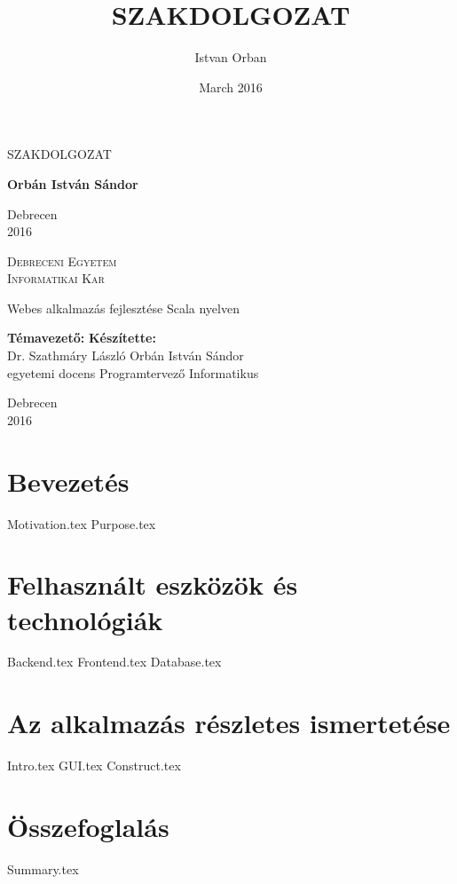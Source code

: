 \documentclass[a4paper, 12pt, oneside]{book}
\title{SZAKDOLGOZAT}
\author{Istvan Orban}
\date{March 2016}
\begin{document}
\begin{titlepage}
	\centering
	\vspace*{4cm}
	{\scshape\LARGE SZAKDOLGOZAT\par}
	\vfill
	{\bfseries \raggedleft Orbán István Sándor\par}
	\vfill

	{\LARGE Debrecen \\ 2016 \par}
	
    \newpage
    \pagestyle{empty}
	\centering
	{\scshape \large Debreceni Egyetem \\ Informatikai Kar\par}
	\vfill
	{\LARGE Webes alkalmazás fejlesztése Scala nyelven\par}
	\vfill
	
    {\textbf{Témavezető:}
    \hfill \hfill \textbf{Készítette:} \\
    Dr. Szathmáry László
    \hfill \hfill 
    Orbán István Sándor \\
    egyetemi docens
    \hfill \hfill Programtervező Informatikus\par}
    
    \vspace{2.5cm}
	{\large Debrecen \\ 2016 \par}
\end{titlepage}


\tableofcontents


\chapter{Bevezetés}
{Motivation.tex}
{Purpose.tex}

\chapter{Felhasznált eszközök és technológiák}
{Backend.tex}
{Frontend.tex}
{Database.tex}

\chapter{Az alkalmazás részletes ismertetése}
{Intro.tex}
{GUI.tex}
{Construct.tex}

\chapter{Összefoglalás}
{Summary.tex}
\end{document}
